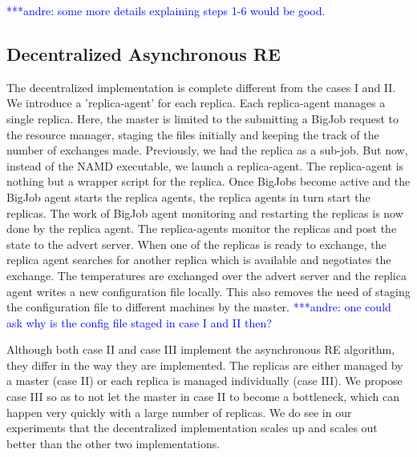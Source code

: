 \documentclass{rspublic}
\newcommand{\alnote}[1]{ {\textcolor{blue} { ***andre: #1 }}}
\newcommand{\alnote}[1]{}
\begin{document}
 \alnote{some more details explaining steps 1-6 would be good.}%

\subsection{Decentralized Asynchronous RE}

The decentralized implementation is complete different from the cases I and II. We introduce
a 'replica-agent' for each replica. Each replica-agent manages a single replica. 
Here, the master is limited to the submitting a BigJob request to the resource manager, 
staging the files initially and keeping the track of the number of exchanges made. Previously, we had the replica as a sub-job. But now, instead of the NAMD executable, we launch a replica-agent.
The replica-agent is nothing but a wrapper script for the replica. 
Once BigJobs become active and the BigJob agent starts the replica agents, the replica agents in turn start the replicas. The work of BigJob agent monitoring and restarting the replicas is now done by the replica agent. The replica-agents 
monitor the replicas and post the state to the advert server. When one of the 
replicas is ready to exchange, the replica agent searches for another replica which is 
available and negotiates the exchange. The temperatures are exchanged over the advert server and the replica agent writes a new configuration file locally. This also removes the need of staging the 
configuration file to different machines by the master. \alnote {one could ask why is the 
config file staged in case I and II then?} 

Although both case II and case III implement the asynchronous RE algorithm, they differ in the way they are implemented. The replicas are either managed by a master (case II) or each replica is managed individually (case III). We propose case III so as to not let the master in case II to become a bottleneck, which can happen very quickly with a large number of replicas. We do see in our experiments that the decentralized implementation scales up and scales out better than the other two implementations.
\end{document}

